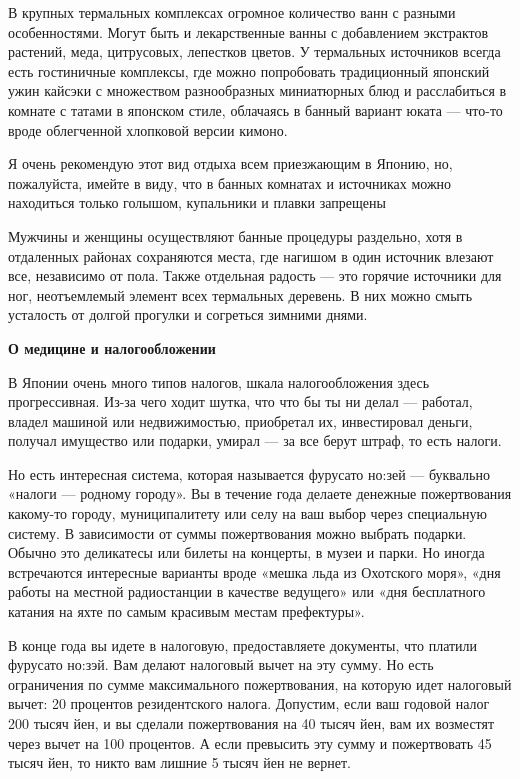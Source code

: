 В крупных термальных комплексах огромное количество ванн с разными особенностями. Могут быть и лекарственные ванны с добавлением экстрактов растений, меда, цитрусовых, лепестков цветов. У термальных источников всегда есть гостиничные комплексы, где можно попробовать традиционный японский ужин кайсэки с множеством разнообразных миниатюрных блюд и расслабиться в комнате с татами в японском стиле, облачаясь в банный вариант юката — что-то вроде облегченной хлопковой версии кимоно.

\begin{fancyquotes}
    Я очень рекомендую этот вид отдыха всем приезжающим в Японию, но, пожалуйста, имейте в виду, что в банных комнатах и источниках можно находиться только голышом, купальники и плавки запрещены
\end{fancyquotes}

Мужчины и женщины осуществляют банные процедуры раздельно, хотя в отдаленных районах сохраняются места, где нагишом в один источник влезают все, независимо от пола. Также отдельная радость — это горячие источники для ног, неотъемлемый элемент всех термальных деревень. В них можно смыть усталость от долгой прогулки и согреться зимними днями.

\textbf{О медицине и налогообложении }

В Японии очень много типов налогов, шкала налогообложения здесь прогрессивная. Из-за чего ходит шутка, что что бы ты ни делал — работал, владел машиной или недвижимостью, приобретал их, инвестировал деньги, получал имущество или подарки, умирал — за все берут штраф, то есть налоги.

Но есть интересная система, которая называется фурусато но:зей — буквально «налоги — родному городу». Вы в течение года делаете денежные пожертвования какому-то городу, муниципалитету или селу на ваш выбор через специальную систему. В зависимости от суммы пожертвования можно выбрать подарки. Обычно это деликатесы или билеты на концерты, в музеи и парки. Но иногда встречаются интересные варианты вроде «мешка льда из Охотского моря», «дня работы на местной радиостанции в качестве ведущего» или «дня бесплатного катания на яхте по самым красивым местам префектуры».

В конце года вы идете в налоговую, предоставляете документы, что платили фурусато но:зэй. Вам делают налоговый вычет на эту сумму. Но есть ограничения по сумме максимального пожертвования, на которую идет налоговый вычет: 20 процентов резидентского налога. Допустим, если ваш годовой налог 200 тысяч йен, и вы сделали пожертвования на 40 тысяч йен, вам их возместят через вычет на 100 процентов. А если превысить эту сумму и пожертвовать 45 тысяч йен, то никто вам лишние 5 тысяч йен не вернет.

